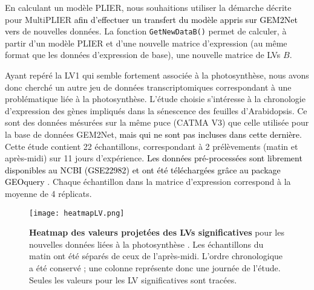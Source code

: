 \documentclass[twoside]{article}
\newcommand{\AR}[1]{\textcolor{black}{#1}}
\begin{document}
 \vspace{0.5cm}En calculant un modèle PLIER, nous souhaitions utiliser la démarche décrite pour MultiPLIER \cite{taroni_multiplier_2019} \AR{afin d'effectuer un transfert du modèle appris sur GEM2Net vers} de nouvelles données. La fonction \texttt{GetNewDataB()} permet de calculer, à partir d'un modèle PLIER et d'une nouvelle matrice d'expression (au même format que les données d'expression de base), une nouvelle matrice de LVs $B$. 

\newpage
Ayant repéré la LV1 qui semble fortement associée à la photosynthèse, nous avons donc cherché un autre jeu de données transcriptomiques correspondant à une problématique liée à la photosynthèse. L'étude choisie \cite{breeze_high-resolution_2011} s'intéresse à la chronologie d'expression des gènes impliqués dans la sénescence des feuilles d'Arabidopsis. Ce sont des données mésurées sur la même puce (CATMA V3) que celle utilisée pour la base de données GEM2Net, \AR{mais qui ne sont pas incluses dans cette dernière}. Cette étude contient 22 échantillons, correspondant à 2 prélèvements (matin et après-midi) sur 11 jours d'expérience. \AR{Les données pré-processées sont librement disponibles au NCBI (GSE22982) et ont été téléchargées grâce au package GEOquery \cite{davis_geoquery_2007}}. Chaque échantillon dans la matrice d'expression correspond à la moyenne de 4 réplicats.

    \begin{figure}[h]
    \centering
        \texttt{[image: heatmapLV.png]}
        \caption[Projection des LVs significatives pour les nouvelles données liées à la  photosynthèse]{\textbf{Heatmap des valeurs projetées des LVs significatives} pour les nouvelles données liées à la  photosynthèse \cite{breeze_high-resolution_2011}. Les échantillons du matin ont été séparés de ceux de l'après-midi. L'ordre chronologique a été conservé ; une colonne représente donc une journée de l'étude. Seules les valeurs pour les LV significatives sont tracées.\label{fig:multi}}
    \end{figure}
\end{document}
